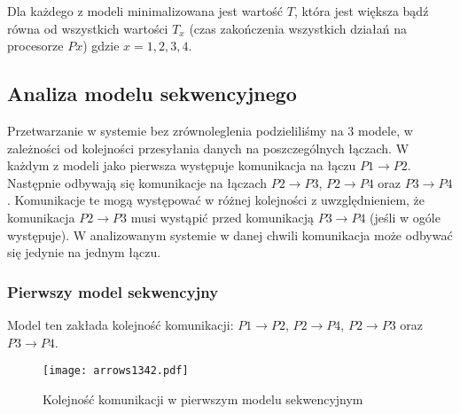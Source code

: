 Dla każdego z modeli minimalizowana jest wartość $T$, która jest większa bądź równa od wszystkich wartości $T_{x}$ (czas zakończenia wszystkich działań na procesorze $Px$) gdzie $x = 1, 2, 3, 4$.
 
\subsection{Analiza modelu sekwencyjnego}

Przetwarzanie w systemie bez zrównoleglenia podzieliliśmy na 3 modele, w zależności od kolejności przesyłania danych na poszczególnych łączach.
W każdym z modeli jako pierwsza występuje komunikacja na łączu $P1 \to P2$. Następnie odbywają się komunikacje na łączach $P2 \to P3$, $P2 \to P4$ oraz $P3 \to P4$.
Komunikacje te mogą występować w różnej kolejności z uwzględnieniem, że komunikacja $P2 \to P3$ musi wystąpić przed komunikacją $P3 \to P4$ (jeśli w ogóle występuje).
W analizowanym systemie w danej chwili komunikacja może odbywać się jedynie na jednym łączu.

\subsubsection{Pierwszy model sekwencyjny}

Model ten zakłada kolejność komunikacji: $P1 \to P2$, $P2 \to P4$, $P2 \to P3$ oraz $P3 \to P4$.

\begin{figure}[!ht]
\centering
\texttt{[image: arrows1342.pdf]}
\caption{Kolejność komunikacji w pierwszym modelu sekwencyjnym}
\label{fig:seq1}
\end{figure}

